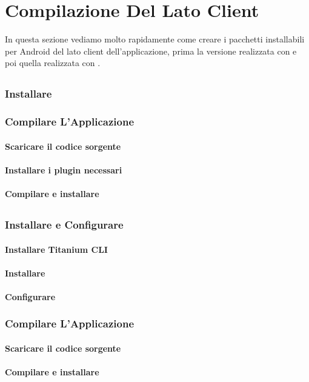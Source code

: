 \chapter{Compilazione Del Lato Client}

In questa sezione vediamo molto rapidamente come creare i pacchetti installabili
per Android del lato client dell'applicazione, prima la versione realizzata con
\pg{} e poi quella realizzata con \tisdk{}.


\section{\pg{}}

    \subsection{Installare \pg{}}

    \subsection{Compilare L'Applicazione}
        \subsubsection{Scaricare il codice sorgente}
        \subsubsection{Installare i plugin necessari}
        \subsubsection{Compilare e installare}


\section{\tisdk{}}

    \subsection{Installare e Configurare \tisdk{}}
        \subsubsection{Installare Titanium CLI}
        \subsubsection{Installare \tisdk{}}
        \subsubsection{Configurare \tisdk{}}
        
    \subsection{Compilare L'Applicazione}
        \subsubsection{Scaricare il codice sorgente}
        \subsubsection{Compilare e installare}
